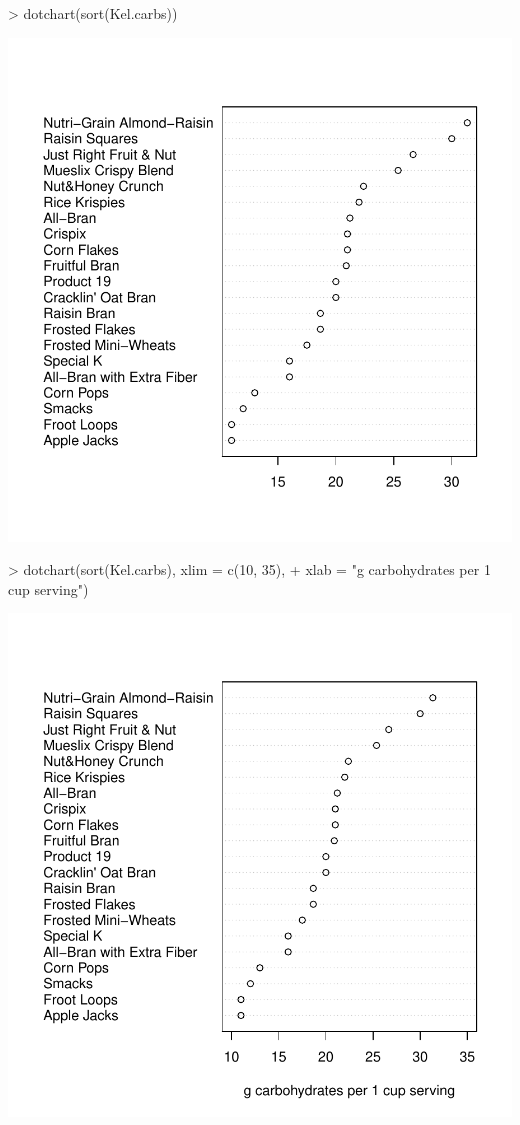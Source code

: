 \begin{Schunk}
\begin{Sinput}
> dotchart(sort(Kel.carbs))
\end{Sinput}
\end{Schunk}
\includegraphics{lect_chapter5_v2-018}

\begin{Schunk}
\begin{Sinput}
> dotchart(sort(Kel.carbs), xlim = c(10, 35), 
+   xlab = "g carbohydrates per 1 cup serving")
\end{Sinput}
\end{Schunk}
\includegraphics{lect_chapter5_v2-019}


